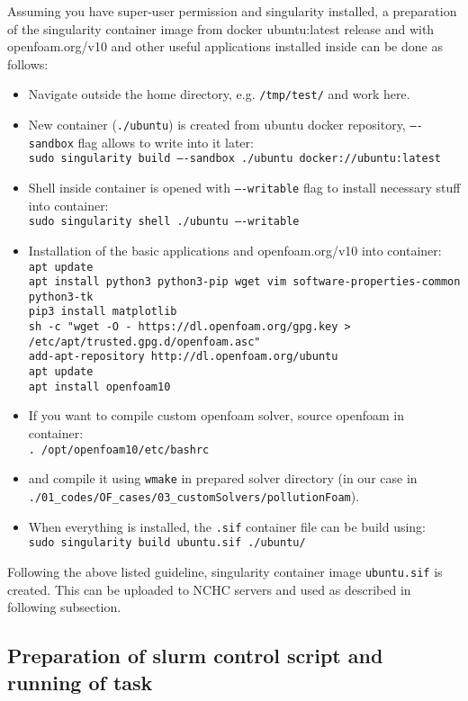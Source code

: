 Assuming you have super-user permission and singularity installed, a preparation of the singularity container image from docker ubuntu:latest release and with openfoam.org/v10 and other useful applications installed inside can be done as follows:
\begin{itemize}
    \item Navigate outside the home directory, e.g. \texttt{/tmp/test/} and work here.
    \item New container (\texttt{./ubuntu}) is created from ubuntu docker repository, \texttt{----sandbox} flag allows to write into it later:\\[0.2cm] 
    \texttt{sudo singularity build ----sandbox ./ubuntu docker://ubuntu:latest}
    \item Shell inside container is opened with \texttt{----writable} flag to install necessary stuff into container:\\[0.2cm] 
    \texttt{sudo singularity shell ./ubuntu ----writable}
    \item Installation of the basic applications and openfoam.org/v10 into container:\\[0.2cm] 
    \texttt{apt update}\\
    \texttt{apt install python3 python3-pip wget vim software-properties-common \\ \indent\quad\quad python3-tk}\\
    \texttt{pip3 install matplotlib}\\
    \texttt{sh -c "wget -O - https://dl.openfoam.org/gpg.key >} \\ \indent\quad\quad\texttt{/etc/apt/trusted.gpg.d/openfoam.asc"}\\
    \texttt{add-apt-repository http://dl.openfoam.org/ubuntu}\\
    \texttt{apt update}\\
    \texttt{apt install openfoam10}
    \item If you want to compile custom openfoam solver, source openfoam in container:\\[0.2cm] 
    \texttt{. /opt/openfoam10/etc/bashrc}
    \item and compile it using \texttt{wmake} in prepared solver directory (in our case in\\ \texttt{./01\_codes/OF\_cases/03\_customSolvers/pollutionFoam}).
    \item When everything is installed, the \texttt{.sif} container file can be build using:\\[0.2cm] 
    \texttt{sudo singularity build ubuntu.sif ./ubuntu/}
\end{itemize}

Following the above listed guideline, singularity container image \texttt{ubuntu.sif} is created. This can be uploaded to NCHC servers and used as described in following subsection. 

\subsection{Preparation of slurm control script and running of task}
\label{subsec:}
